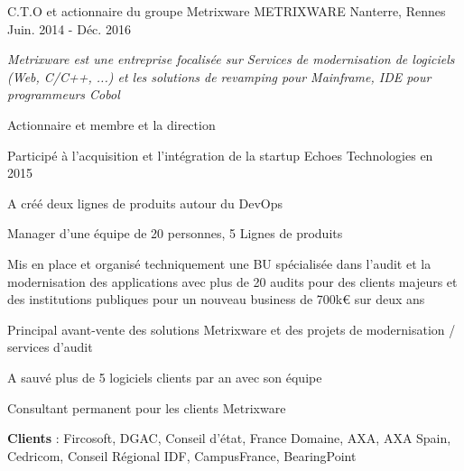 \begin{cventries}
{\begin{cvitems}
	\end{cvitems}
}
  \cventry
    {C.T.O et actionnaire du groupe Metrixware} %
    {METRIXWARE} %
    {Nanterre, Rennes} %
    {Juin. 2014 - Déc. 2016} %
    {
      \begin{cvitems} %
        \item {\textit{Metrixware est une entreprise focalisée sur Services de modernisation de logiciels (Web, C/C++, ...) et les solutions de revamping pour Mainframe, IDE pour programmeurs Cobol}}
        \item {Actionnaire et membre et la direction}
        \item {Participé à l'acquisition et l'intégration de la startup Echoes Technologies en 2015}
        \item {A créé deux lignes de produits autour du DevOps}
        \item {Manager d'une équipe de 20 personnes, 5 Lignes de produits}
        \item {Mis en place et organisé techniquement une BU spécialisée dans l'audit et la modernisation des applications avec plus de 20 audits pour des clients majeurs et des institutions publiques pour un nouveau business de 700k€ sur deux ans}
        \item {Principal avant-vente des solutions Metrixware et des projets de modernisation / services d'audit}
        \item {A sauvé plus de 5 logiciels clients par an avec son équipe}
        \item {Consultant permanent pour les clients Metrixware}
        \item {\textbf{Clients} : Fircosoft, DGAC, Conseil d'état, France Domaine, AXA, AXA Spain, Cedricom, Conseil Régional IDF, CampusFrance, BearingPoint}
      \end{cvitems}
    }


\end{cventries}
